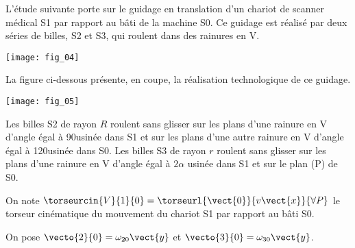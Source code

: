 \ifprof
\else
\begin{multicols}{2}
\fi





L’étude suivante porte sur le guidage en translation d’un chariot 
de scanner médical S1 par rapport au bâti de la machine S0. Ce 
guidage est réalisé par deux séries de billes, S2 et S3, qui roulent 
dans des rainures en V. 
\begin{center}
\texttt{[image: fig\_04]}
\end{center}

La figure ci-dessous présente, en coupe, la réalisation technologique de ce guidage. 

\begin{center}
\texttt{[image: fig\_05]}
\end{center}

Les billes S2 de rayon $R$ roulent sans glisser sur les plans d’une rainure en V d’angle égal à 90\textdegree usinée dans 
S1 et sur les plans d’une autre rainure en V d’angle égal à 120\textdegree usinée dans S0. 
Les billes S3 de rayon $r$ roulent sans glisser sur les plans d’une rainure en V d’angle égal à 
$2\alpha$ usinée dans 
S1 et sur le plan (P) de S0. 

On note $\torseurcin{V}{1}{0}=\torseurl{\vect{0}}{v\vect{x}}{\forall P}$ le torseur cinématique du mouvement du chariot S1 par rapport au bâti S0. 

On pose $\vecto{2}{0} = \omega_{20}\vect{y}$ et $\vecto{3}{0} = \omega_{30}\vect{y}$.

\ifprof
\begin{corrige}
\end{corrige} \else \fi

\ifprof
\begin{corrige}
\end{corrige} \else \fi

\ifprof
\begin{corrige}
\end{corrige} \else \fi


\end{multicols}
